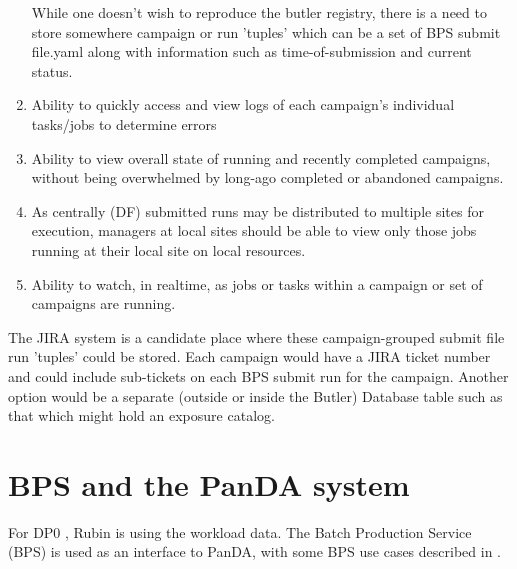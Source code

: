 \documentclass[DM,authoryear,toc]{lsstdoc}
\begin{document}
\begin{enumerate}
	While one doesn't wish to reproduce the butler registry, there
	is a need to store somewhere campaign or run 'tuples' which
	can be a set of BPS submit file.yaml along with information
	such as time-of-submission and current status.  


	\item Ability to quickly access and view logs of each 
	campaign's individual tasks/jobs to determine errors

	\item Ability to view overall state of running and recently
	completed campaigns, without being overwhelmed by long-ago completed
	or abandoned campaigns.

	\item As centrally (DF) submitted runs may be distributed to 
	multiple sites for execution, managers at local sites should 
	be able to view only those jobs running at their local site on local 
	resources.

	\item Ability to watch, in realtime, as jobs or tasks within
	a campaign or set of campaigns are running.  

	\end {enumerate}

	The JIRA system is a candidate place where these campaign-grouped submit file
	run 'tuples' could be stored.  Each campaign would have a JIRA ticket number
	and could include sub-tickets on each BPS submit run for the campaign.
	Another option would be a separate (outside or inside the Butler) Database table such as 
	that which might hold an exposure catalog.

\section{BPS and the PanDA system}

For DP0 \cite{RTN-013}, Rubin is using 
the \cite{PanDA} workload data.  The Batch Production 
Service (BPS) \cite{LDM-636} is used as an interface to PanDA, with
some BPS use cases described in \cite{LDM-633}.  
\end{document}

